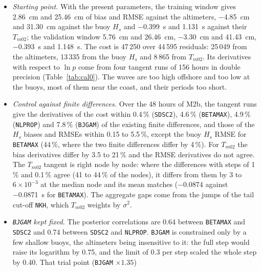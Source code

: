 \documentclass[11pt,a4paper]{article}
\begin{document}
\begin{itemize}
5 January, then $+3.7$ to \SI{+6.5}{cm}. The training window, 5 January
12\,h to 7 January 12\,h, holds 24\,153 altimeter blocks and 255 buoys
(12\,247 hours of $H_s$, 8\,292 of $T_{m02}$); the validation window,
7 January 13\,h to 10 January 00\,h, 27\,935 blocks and 257 buoys. Buoys whose $T_{m02}$ RMSE exceeds \SI{3}{s} at the
start (2 in the training window) count in the scores but not in the cost.
\item \emph{Starting point.} With the present parameters, the training
window gives \SI{+2.86}{cm} and \SI{25.46}{cm} of bias and RMSE against
the altimeters, \SI{-4.85}{cm} and \SI{31.30}{cm} against the buoy $H_s$
and \SI{-0.399}{s} and \SI{1.131}{s} against their $T_{m02}$; the
validation window \SI{+5.76}{cm} and \SI{26.46}{cm}, \SI{-3.30}{cm} and
\SI{41.43}{cm}, \SI{-0.393}{s} and \SI{1.148}{s}. The cost is 47\,250 over
44\,595 residuals: 25\,049 from the altimeters, 13\,335 from the buoy
$H_s$ and 8\,865 from $T_{m02}$. Its derivatives with respect to
$\ln p$ come from four tangent runs of 156 hours in double precision
(Table~\ref{tab:cal0}). The waves are too high offshore and too low at
the buoys, most of them near the coast, and their periods too short.
\item \emph{Control against finite differences.} Over the 48 hours of
M2b, the tangent runs give the derivatives of the cost within 0.4\,\%
(\texttt{SDSC2}), 4.6\,\% (\texttt{BETAMAX}), 4.9\,\% (\texttt{NLPROP})
and 7.8\,\% (\texttt{BJGAM}) of the existing finite differences, and those
of the $H_s$ biases and RMSEs within 0.15 to 5.5\,\%, except the buoy
$H_s$ RMSE for \texttt{BETAMAX} (44\,\%, where the two finite differences
differ by 4\,\%). For $T_{m02}$ the bias derivatives differ by 3.5 to
21\,\% and the RMSE derivatives do not agree. The $T_{m02}$ tangent is
right node by node: where the differences with steps of 1\,\% and
0.1\,\% agree (41 to 44\,\% of the nodes), it differs from them by
$3$ to $6\times10^{-3}$ at the median node and its mean matches
($-0.0874$ against \SI{-0.0871}{s} for \texttt{BETAMAX}). The aggregate
gaps come from the jumps of the tail cut-off \texttt{NKH}, which
$T_{m02}$ weights by $\sigma^2$.
\item \emph{\texttt{BJGAM} kept fixed.} The posterior correlations are
0.64 between \texttt{BETAMAX} and \texttt{SDSC2} and 0.74 between
\texttt{SDSC2} and \texttt{NLPROP}. \texttt{BJGAM} is constrained only by
a few shallow buoys, the altimeters being insensitive to it: the full step
would raise its logarithm by 0.75, and the limit of 0.3 per step scaled
the whole step by 0.40. That trial point (\texttt{BJGAM} $\times1.35$)

\end{itemize}
\end{document}

